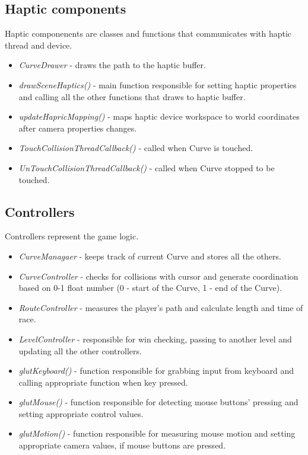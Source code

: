 \subsection{Haptic components}
Haptic componenents are classes and functions that communicates with haptic thread and device. 
\begin{itemize} [noitemsep]
\item \emph{CurveDrawer} - draws the path to the haptic buffer. 
\item \emph{drawSceneHaptics()} - main function responsible for setting haptic properties and calling all the other functions that draws to haptic buffer.
\item \emph{updateHapricMapping()} - maps haptic device workspace to world coordinates after camera properties changes. 
\item \emph{TouchCollisionThreadCallback()} - called when Curve is touched.
\item \emph{UnTouchCollisionThreadCallback()} - called when Curve stopped to be touched. 

\end{itemize}

\subsection{Controllers}
\label{controllers}
Controllers represent the game logic. 
\begin{itemize} [noitemsep]
\item \emph{CurveManagaer} - keeps track of current Curve and stores all the others.
\item \emph{CurveController} - checks for collisions with cursor and generate coordination based on 0-1 float number (0 - start of the Curve, 1 - end of the Curve).
\item \emph{RouteController} - measures the player's path and calculate length and time of race.
\item \emph{LevelController} - responsible for win checking, passing to another level and updating all the other controllers.
\item \emph{glutKeyboard()} - function responsible for grabbing input from keyboard and calling appropriate function when key pressed.
\item \emph{glutMouse()} - function responsible for detecting mouse buttons' pressing and setting appropriate control values. 
\item \emph{glutMotion()} - function responsible for measuring mouse motion and setting appropriate camera values, if mouse buttons are pressed. 
\end{itemize}

